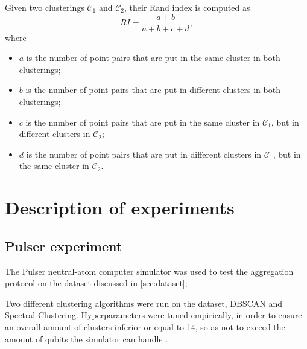 Given two clusterings $\mathcal{C}_{1}$ and $\mathcal{C}_{2}$, their Rand index is computed as  
\begin{equation}
  \label{eqn:rand}
  RI = \frac{a + b}{a + b + c + d},
\end{equation}
where
\begin{itemize}
  \item $a$ is the number of point pairs that are put in the same cluster in both clusterings;
  \item $b$ is the number of point pairs that are put in different clusters in both clusterings; 
  \item $c$ is the number of point pairs that are put in the same cluster in $\mathcal{C}_{1}$, but in different clusters in $\mathcal{C}_{2}$;
  \item $d$ is the number of point pairs that are put in different clusters in $\mathcal{C}_{1}$, but in the same cluster in $\mathcal{C}_{2}$.
\end{itemize}

\section{Description of experiments}

\subsection{Pulser experiment}
The Pulser neutral-atom computer simulator was used to test the aggregation protocol on the dataset discussed in \ref{sec:dataset}; 

Two different clustering algorithms were run on the dataset, DBSCAN and Spectral Clustering. Hyperparameters were tuned empirically, in order to ensure an overall amount of clusters inferior or equal to 14, so as not to exceed the amount of qubits the simulator can handle \cite{Johansson2012}.

\begin{figure}
  \centering 
  
\end{figure}